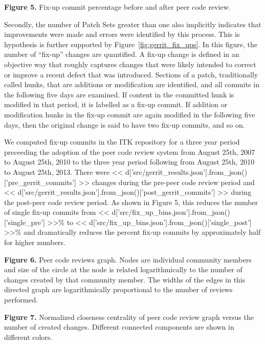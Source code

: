 \documentclass{frontiersENG} %
\begin{document}
\textbf{Figure 5. }{Fix-up commit percentage before and after peer code review.}
\label{fig:05}

Secondly, the number of Patch Sets greater than one also implicitly indicates that
improvements were made and errors were identified by this process.  This is
hypothesis is further supported by Figure~\ref{fig:gerrit_fix_ups}.  In this
figure, the number of ``fix-up'' changes are quantified. A fix-up change is
defined in an objective way that roughly captures changes that were likely
intended to correct or improve a recent defect that was introduced.  Sections
of a patch, traditionally called hunks, that are additions or modification are
identified, and all commits in the following five days are examined.  If
content in the committed hunk is modified in that period, it is labelled as
a fix-up commit.  If addition or modification hunks in the fix-up commit are again
modified in the following five days, then the original change is said to have
two fix-up commits, and so on.

We computed fix-up commits in the ITK repository for a three year period
preceeding the adoption of the peer code review system from August 25th, 2007
to August 25th, 2010 to the three year period following from August 25th, 2010
to August 25th, 2013.  There were
<< d['src/gerrit_results.json'].from_json()['pre_gerrit_commits'] >>
changes during the pre-peer code review period and
<< d['src/gerrit_results.json'].from_json()['post_gerrit_commits'] >>
during the post-peer code review period.  As shown in
Figure 5, this reduces the number of
single fix-up commits from <<
d['src/fix_up_bins.json'].from_json()['single_pre'] >>\%
to << d['src/fix_up_bins.json'].from_json()['single_post'] >>\% and
dramatically reduces the percent fix-up commits by approximately half for
higher numbers.

\textbf{Figure 6. } {Peer code reviews graph.  Nodes are individual community
members and size of the circle at the node is related logarithmically to the
number of changes created by that community member.  The widths of the edges in
this directed graph are logarithmically proportional to the number of reviews
performed.} \label{fig:06}

\textbf{Figure 7. }{Normalized closeness centrality of peer code review graph
versus the number of created changes.  Different connected components are shown
in different colors.}\label{fig:07}
\end{document}
